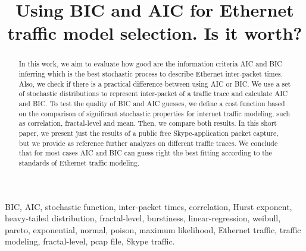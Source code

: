 \title{Using BIC and AIC for Ethernet traffic model selection. Is it worth?}

\author{
\and
{}
}

\maketitle

\begin{abstract}
In this work, we aim to evaluate how good are the information criteria AIC and BIC inferring which is the best stochastic process to describe Ethernet inter-packet times. Also, we check if there is a practical difference between using AIC or BIC. We use a set of stochastic distributions to represent inter-packet of a traffic trace and calculate AIC and BIC. To test the quality of  BIC and AIC guesses,  we define a cost function based on the comparison of significant stochastic properties for internet traffic modeling, such as correlation, fractal-level and mean. Then, we compare both results.  In this short paper, we present just the results of a public free Skype-application packet capture, but we provide as reference further analyzes on different traffic traces. We conclude that for most cases AIC and BIC can guess right the best fitting according to the standards of Ethernet traffic modeling.
\end{abstract}

\begin{IEEEkeywords}
BIC, AIC, stochastic function, inter-packet times, correlation, Hurst exponent, heavy-tailed distribution, fractal-level, burstiness, linear-regression, weibull, pareto, exponential, normal, poison, maximum likelihood, Ethernet traffic, traffic modeling, fractal-level, pcap file, Skype traffic.
\end{IEEEkeywords}
